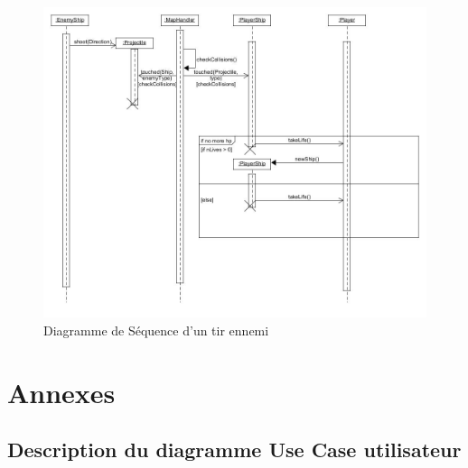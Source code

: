 \documentclass[a4paper,12pt]{article}
\begin{document}
\begin{figure}[hbtp]
\centering
\includegraphics[scale=0.3]{images/enemy_shooting.jpg}
\caption{Diagramme de Séquence d'un tir ennemi }
\end{figure}

\newpage
\section{Annexes}
\subsection{ Description du diagramme Use Case utilisateur}
\end{document}
